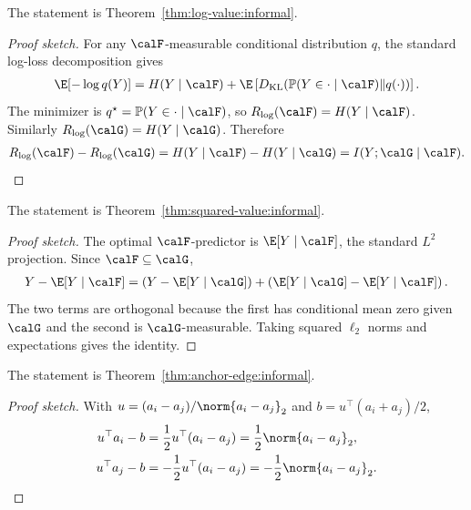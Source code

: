 \begin{theorem}
\label{thm:log-value:sketch}
The statement is Theorem~\ref{thm:log-value:informal}.
\end{theorem}
\begin{proof}[Proof sketch]
For any $\calF$-measurable conditional distribution $q$, the standard log-loss decomposition gives
\begin{align*}
\E[-\log q(Y)]=H(Y\mid\calF)+\E\left[D_{\mathrm{KL}}(\mathbb P(Y\in\cdot\mid\calF)\|q(\cdot))\right].
\end{align*}
The minimizer is $q^\star=\mathbb P(Y\in\cdot\mid\calF)$, so $R_{\log}(\calF)=H(Y\mid\calF)$. Similarly $R_{\log}(\calG)=H(Y\mid\calG)$. Therefore
\begin{align*}
R_{\log}(\calF)-R_{\log}(\calG)=H(Y\mid\calF)-H(Y\mid\calG)=I(Y;\calG\mid\calF).
\end{align*}
\end{proof}

\begin{theorem}
\label{thm:squared-value:sketch}
The statement is Theorem~\ref{thm:squared-value:informal}.
\end{theorem}
\begin{proof}[Proof sketch]
The optimal $\calF$-predictor is $\E[Y\mid\calF]$, the standard $L^2$ projection. Since $\calF\subseteq\calG$,
\begin{align*}
Y-\E[Y\mid\calF]=\left(Y-\E[Y\mid\calG]\right)+\left(\E[Y\mid\calG]-\E[Y\mid\calF]\right).
\end{align*}
The two terms are orthogonal because the first has conditional mean zero given $\calG$ and the second is $\calG$-measurable. Taking squared $\ell_2$ norms and expectations gives the identity.
\end{proof}

\begin{theorem}
\label{thm:anchor-edge:sketch}
The statement is Theorem~\ref{thm:anchor-edge:informal}.
\end{theorem}
\begin{proof}[Proof sketch]
With $u=(a_i-a_j)/\norm{a_i-a_j}_2$ and $b=u^\top(a_i+a_j)/2$,
\begin{align*}
u^\top a_i-b&=\frac{1}{2}u^\top(a_i-a_j)=\frac{1}{2}\norm{a_i-a_j}_2,\\
u^\top a_j-b&=-\frac{1}{2}u^\top(a_i-a_j)=-\frac{1}{2}\norm{a_i-a_j}_2.
\end{align*}
\end{proof}

